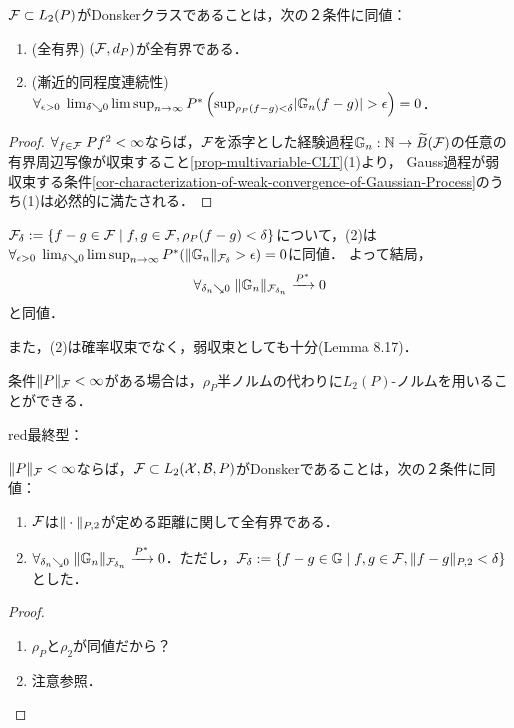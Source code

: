 \documentclass[uplatex,dvipdfmx]{jsreport}
\begin{document}
\begin{corollary}[Donskerクラスであることの特徴付け１]\label{cor-characterization-of-Donsker-classes-1}
    $\mathcal{F}\subset L_2(P)$がDonskerクラスであることは，次の２条件に同値：
    \begin{enumerate}
        \item (全有界) $(\mathcal{F},d_P)$が全有界である．
        \item (漸近的同程度連続性) $\forall_{\epsilon>0}\;\lim_{\delta\searrow 0}\limsup_{n\to\infty} P^*\left(\sup_{\rho_P(f-g)<\delta}\lvert\mathbb{G}_n(f-g)\rvert>\epsilon\right)=0$．
    \end{enumerate}
\end{corollary}
\begin{proof}
    $\forall_{f\in\mathcal{F}}\;Pf^2<\infty$ならば，$\mathcal{F}$を添字とした経験過程$\mathbb{G}_n:\mathbb{N}\to\widetilde{B}(\mathcal{F})$の任意の有界周辺写像が収束すること\ref{prop-multivariable-CLT}(1)より，
    Gauss過程が弱収束する条件\ref{cor-characterization-of-weak-convergence-of-Gaussian-Process}のうち(1)は必然的に満たされる．
\end{proof}
\begin{remark}[漸近的同程度連続性の特徴付け]
    $\mathcal{F}_\delta:=\left\{f-g\in\mathcal{F}\mid f,g\in\mathcal{F},\rho_P(f-g)<\delta\right\}$について，(2)は
    $\forall_{\epsilon>0}\;\lim_{\delta\searrow0}\limsup_{n\to\infty}P^*(\|\mathbb{G}_n\|_{\mathcal{F}_\delta}>\epsilon)=0$に同値．
    よって結局，
    \[\forall_{\delta_n\searrow 0}\;\|\mathbb{G}_n\|_{\mathcal{F}_{\delta_n}}\xrightarrow{P^*}0\]
    と同値．

    また，(2)は確率収束でなく，弱収束としても十分\cite{Kosorok}(Lemma 8.17)．
\end{remark}

条件$\|P\|_{\mathcal{F}}<\infty$がある場合は，$\rho_P$半ノルムの代わりに$L_2(P)$-ノルムを用いることができる．

\begin{tbox}{red}{最終型：}
    \begin{corollary}\label{cor-characterization-of-Donsker-classes-2}
        $\|P\|_{\mathcal{F}}<\infty$ならば，$\mathcal{F}\subset L_2(\mathcal{X},\mathcal{B},P)$がDonskerであることは，次の２条件に同値：
        \begin{enumerate}
            \item $\mathcal{F}$は$\|\cdot\|_{P,2}$が定める距離に関して全有界である．
            \item $\forall_{\delta_n\searrow 0}\;\|\mathbb{G}_n\|_{\mathcal{F}_{\delta_n}}\xrightarrow{P^*}0$．ただし，$\mathcal{F}_\delta:=\left\{f-g\in\mathbb{G}\mid f,g\in\mathcal{F},\|f-g\|_{P,2}<\delta\right\}$とした．
        \end{enumerate}
    \end{corollary}
\end{tbox}
\begin{proof}\mbox{}
    \begin{enumerate}
        \item $\rho_P$と$\rho_2$が同値だから？
        \item 注意参照．
    \end{enumerate}
\end{proof}
\end{document}

